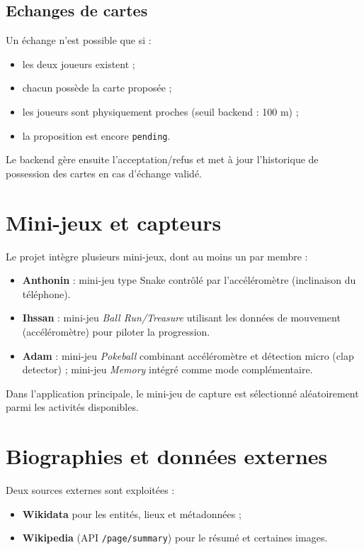 \documentclass[11pt,a4paper]{article}
\begin{document}
\subsection{Echanges de cartes}
Un échange n'est possible que si :
\begin{itemize}[leftmargin=1.2cm]
  \item les deux joueurs existent ;
  \item chacun possède la carte proposée ;
  \item les joueurs sont physiquement proches (seuil backend : 100 m) ;
  \item la proposition est encore \texttt{pending}.
\end{itemize}

Le backend gère ensuite l'acceptation/refus et met à jour l'historique de possession des cartes en cas d'échange validé.

\section{Mini-jeux et capteurs}
Le projet intègre plusieurs mini-jeux, dont au moins un par membre :
\begin{itemize}[leftmargin=1.2cm]
  \item \textbf{Anthonin} : mini-jeu type Snake contrôlé par l'accéléromètre (inclinaison du téléphone).
  \item \textbf{Ihssan} : mini-jeu \emph{Ball Run/Treasure} utilisant les données de mouvement (accéléromètre) pour piloter la progression.
  \item \textbf{Adam} : mini-jeu \emph{Pokeball} combinant accéléromètre et détection micro (clap detector) ; mini-jeu \emph{Memory} intégré comme mode complémentaire.
\end{itemize}

Dans l'application principale, le mini-jeu de capture est sélectionné aléatoirement parmi les activités disponibles.

\section{Biographies et données externes}
Deux sources externes sont exploitées :
\begin{itemize}[leftmargin=1.2cm]
  \item \textbf{Wikidata} pour les entités, lieux et métadonnées ;
  \item \textbf{Wikipedia} (API \texttt{/page/summary}) pour le résumé et certaines images.
\end{itemize}
\end{document}
